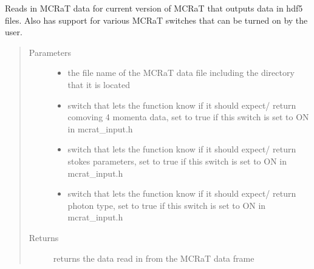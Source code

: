 \documentclass[letterpaper,10pt,english]{sphinxmanual}
\begin{document}

\begin{fulllineitems}
\label{\detokenize{read_process_files:read_process_files.read_mcrat_h5}}
Reads in MCRaT data for current version of MCRaT that outputs data in hdf5 files. Also has support for various
MCRaT switches that can be turned on by the user.
\begin{quote}\begin{description}
\item[{Parameters}] \leavevmode\begin{itemize}
\item {} 
 \textendash{} the file name of the MCRaT data file including the directory that it is located

\item {} 
 \textendash{} switch that lets the function know if it should expect/ return comoving 4 momenta data, set to true
if this switch is set to ON in mcrat\_input.h

\item {} 
 \textendash{} switch that lets the function know if it should expect/ return stokes parameters, set to true
if this switch is set to ON in mcrat\_input.h

\item {} 
 \textendash{} switch that lets the function know if it should expect/ return photon type, set to true
if this switch is set to ON in mcrat\_input.h

\end{itemize}

\item[{Returns}] \leavevmode
returns the data read in from the MCRaT data frame

\end{description}\end{quote}

\end{fulllineitems}

\end{document}
